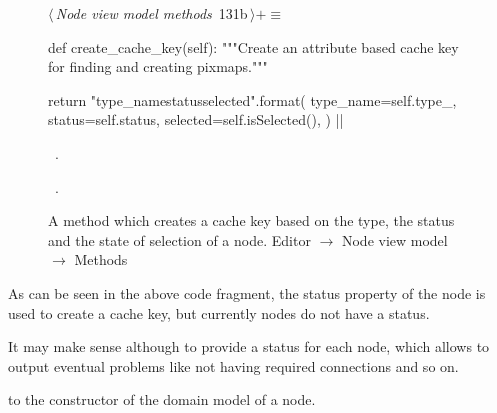 \documentclass[%
    a4paper,    %
    justified,  %
    nobib,      %
    openany     %
]{tufte-book}
\makeatletter
\renewcommand{\label}[1]{\@tufte@label{##1}}%
\makeatother
\begin{document}
\begin{figure}[!htbp]
\begin{flushleft} \small
\begin{minipage}{\linewidth}\label{scrap74}\raggedright\small
{} $\langle\,${\itshape Node view model methods}\nobreak\ {\footnotesize {131b}}$\,\rangle+\equiv$
\vspace{-1ex}
\begin{pythoncode}
def create_cache_key(self):
    """Create an attribute based cache key for finding and
    creating pixmaps."""

    return "{type_name}{status}{selected}".format(
        type_name=self.type_,
        status=self.status,
        selected=self.isSelected(),
    )
|\NWsep|
\end{pythoncode}
\vspace{1.5ex}
\footnotesize
\begin{list}{}{\setlength{\itemsep}{-\parsep}\setlength{\itemindent}{-\leftmargin}}
\item \NWtxtMacroDefBy\ .
\item \NWtxtMacroRefIn\ .

\item{}
\end{list}
\end{minipage}\vspace{4ex}
\end{flushleft}
\caption{A method which creates a cache key based on the type, the status and
  the state of selection of a node.
  \newline{}\newline{}Editor $\rightarrow$ Node view model $\rightarrow$
  Methods}
\end{figure}

As can be seen in the above code fragment, the status property of the node is
used to create a cache key, but currently nodes do not have a status.

It may make sense although to provide a status for each node, which allows to
output eventual problems like not having required connections and so on.

 to the constructor of the domain model of a node.
\end{document}
